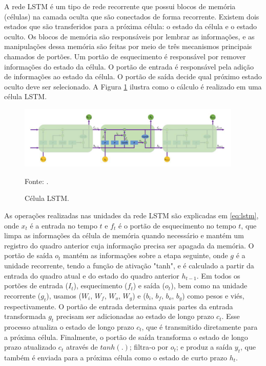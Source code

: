             \ipar A rede \acrshort{LSTM} é um tipo de rede recorrente que possui blocos de memória (células) na camada oculta que são conectados de forma recorrente. Existem dois estados que são transferidos para a próxima célula: o estado da célula e o estado oculto. Os blocos de memória são responsáveis por lembrar as informações, e as manipulações dessa memória são feitas por meio de três mecanismos principais chamados de portões. Um portão de esquecimento é responsável por remover informações do estado da célula. O portão de entrada é responsável pela adição de informações ao estado da célula. O portão de saída decide qual próximo estado oculto deve ser selecionado. A Figura \ref{fig:lstm} ilustra como o cálculo é realizado em uma célula \acrshort{LSTM}.

            \begin{figure}[htbp]
                \centering
                \caption{Célula LSTM.}
                \label{fig:lstm}
                \includegraphics[width=0.95\textwidth]{imagens/lstm.png}
                \par \footnotesize Fonte: .
            \end{figure}


            \ipar As operações realizadas nas unidades da rede \acrshort{LSTM} são explicadas em \eqref{eq:lstm}, onde $x_t$ é a entrada no tempo $t$ e $f_t$ é o portão de esquecimento no tempo $t$, que limpa as informações da célula de memória quando necessário e mantém um registro do quadro anterior cuja informação precisa ser apagada da memória. O portão de saída $o_t$ mantém as informações sobre a etapa seguinte, onde $g$ é a unidade recorrente, tendo a função de ativação "tanh", e é calculado a partir da entrada do quadro atual e do estado do quadro anterior $h_{t-1}$. Em todos os portões de entrada ($I_t$), esquecimento ($f_t$) e saída ($o_t$), bem como na unidade recorrente ($g_t$), usamos ($W_i$, $W_f$, $W_o$, $W_g$) e ($b_i$, $b_f$, $b_o$, $b_g$) como pesos e viés, respectivamente. O portão de entrada determina quais partes da entrada transformada $g_t$ precisam ser adicionadas ao estado de longo prazo $c_t$. Esse processo atualiza o estado de longo prazo $c_t$, que é transmitido diretamente para a próxima célula. Finalmente, o portão de saída transforma o estado de longo prazo atualizado $c_t$ através de $tanh(.)$; filtra-o por $o_t$; e produz a saída $y_t$, que também é enviada para a próxima célula como o estado de curto prazo $h_t$.

